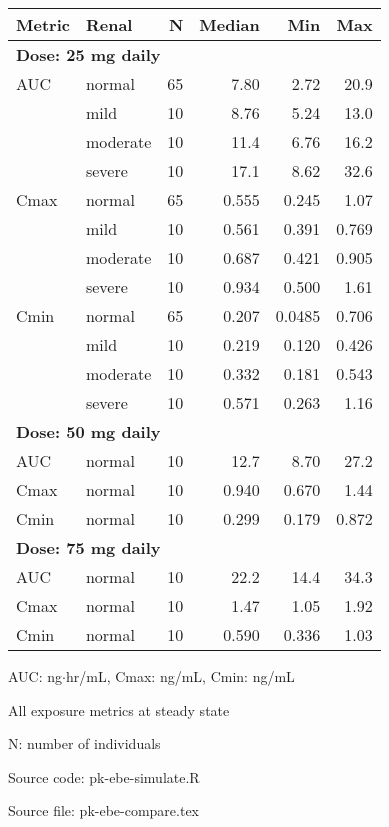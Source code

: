 \setlength{\tabcolsep}{5pt} 
\begin{threeparttable}
\renewcommand{\arraystretch}{1.3}
\begin{tabular}[h]{llrrrr}
\hline
Metric & Renal & N & Median & Min & Max \\
\hline
\multicolumn{6}{l}{\textbf{Dose: 25 mg daily}}\\%
AUC & normal & 65 & 7.80 & 2.72 & 20.9 \\
 & mild & 10 & 8.76 & 5.24 & 13.0 \\
 & moderate & 10 & 11.4 & 6.76 & 16.2 \\
 & severe & 10 & 17.1 & 8.62 & 32.6 \\
Cmax & normal & 65 & 0.555 & 0.245 & 1.07 \\
 & mild & 10 & 0.561 & 0.391 & 0.769 \\
 & moderate & 10 & 0.687 & 0.421 & 0.905 \\
 & severe & 10 & 0.934 & 0.500 & 1.61 \\
Cmin & normal & 65 & 0.207 & 0.0485 & 0.706 \\
 & mild & 10 & 0.219 & 0.120 & 0.426 \\
 & moderate & 10 & 0.332 & 0.181 & 0.543 \\
 & severe & 10 & 0.571 & 0.263 & 1.16 \\
\hline \multicolumn{6}{l}{\textbf{Dose: 50 mg daily}}\\%
AUC & normal & 10 & 12.7 & 8.70 & 27.2 \\
Cmax & normal & 10 & 0.940 & 0.670 & 1.44 \\
Cmin & normal & 10 & 0.299 & 0.179 & 0.872 \\
\hline \multicolumn{6}{l}{\textbf{Dose: 75 mg daily}}\\%
AUC & normal & 10 & 22.2 & 14.4 & 34.3 \\
Cmax & normal & 10 & 1.47 & 1.05 & 1.92 \\
Cmin & normal & 10 & 0.590 & 0.336 & 1.03 \\
\hline
\end{tabular}
\begin{tablenotes}[flushleft]
\item AUC: ng$\cdot$hr/mL, Cmax: ng/mL, Cmin: ng/mL
\item All exposure metrics at steady state
\item N: number of individuals
\item Source code: pk-ebe-simulate.R
\item Source file: pk-ebe-compare.tex
\end{tablenotes}
\end{threeparttable}
